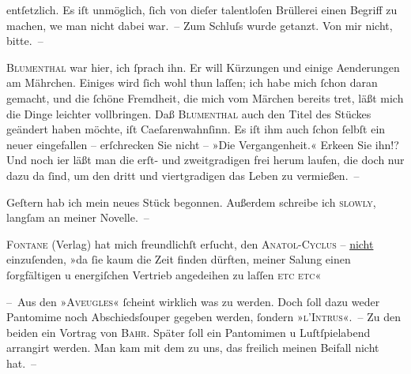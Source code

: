               entſetzlich. Es iſt unmöglich, ſich von dieſer talentloſen Brüllerei einen Begriff zu
               machen, we{\geminationn} man nicht dabei {\pb}war. – Zum Schluſs wurde getanzt. Von mir nicht,
               bitte. – \pend
           
\pstart
           \textsc{Blumenthal} war hier, ich ſprach ihn. Er will Kürzungen und einige Aenderungen am Mährchen. Einiges wird ſich wohl thun laſſen; ich
               habe mich ſchon daran gemacht, und die ſchöne Fremdheit, die mich vom Märchen bereits tre{\geminationn}t, läßt mich die Dinge leichter vollbringen. Daß \textsc{Blumenthal} auch den Titel des Stückes geändert haben möchte, iſt Caeſarenwahnſinn. Es iſt
               ihm auch ſchon ſelbſt ein neuer eingefallen – er{\pb}ſchrecken Sie nicht – »Die Vergangenheit.« Erke{\geminationn}en Sie
               ihn!? Und noch i{\geminationm}er läßt man die erſt- und zweitgradigen
               frei herum laufen, die doch nur dazu da ſind, um den dritt und viertgradigen das
               Leben zu vermießen. –\pend
           
\pstart
           Geſtern hab ich mein neues Stück begonnen. Außerdem schreibe ich \textsc{slowly},
               langſam an meiner Novelle. –\pend
           
\pstart
           \textsc{Fontane} (Verlag) hat mich freundlichſt erſucht, den
                  \textsc{Anatol-Cyclus} – \uline{nicht} einzuſenden, {\pb}»da ſie kaum die Zeit finden dürften, meiner Sa{\geminationm}lung einen ſorgfältigen u energiſchen Vertrieb
               angedeihen zu laſſen \textsc{etc etc}«\pend
           
\pstart
           – Aus den »\textsc{Aveugles}« ſcheint wirklich was zu werden. Doch ſoll dazu weder Pantomime noch Abschiedsſouper gegeben werden, ſondern »\textsc{l’Intrus}«. – Zu den beiden ein Vortrag von \textsc{Bahr}. Später ſoll ein Pantomimen u Luſtſpielabend arrangirt werden. Man kam mit dem
                  \label{K_L00079-2v}\label{K_L00079-2}
               zu uns, das {\pb}freilich meinen Beifall nicht hat. –\pend
           
